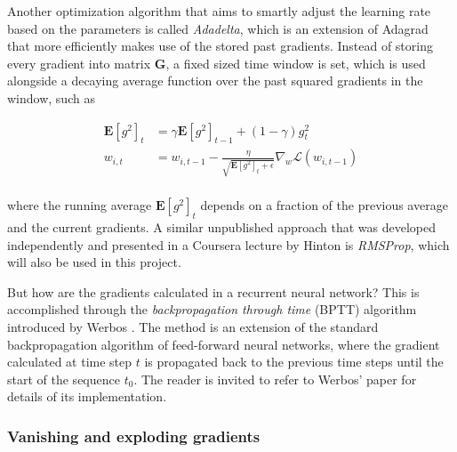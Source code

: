 \documentclass{kththesis}
\begin{document}
Another optimization algorithm that aims to smartly adjust the learning rate based on the parameters is called \emph{Adadelta}\citep{zeiler2012adadelta}, which is an extension of Adagrad that more efficiently makes use of the stored past gradients. Instead of storing every gradient into matrix $\mathbf{G}$, a fixed sized time window is set, which is used alongside a decaying average function over the past squared gradients in the window, such as

\begin{equation}
\begin{aligned}
\mathbf{E}[g^2]_t &= \gamma \mathbf{E}[g^2]_{t-1} + (1-\gamma)g^2_t\\
w_{i,t} &= w_{i,t-1} - \frac{\eta}{\sqrt{\mathbf{E}[g^2]_t + \epsilon}} \nabla_w \mathcal{L}(w_{i,t-1}) \\
\end{aligned}
\end{equation}

where the running average $\mathbf{E}[g^2]_t$ depends on a fraction of the previous average and the current gradients. A similar unpublished approach that was developed independently and presented in a Coursera lecture by Hinton is \emph{RMSProp}\citep{hinton2012rmsprop}, which will also be used in this project. 

But how are the gradients calculated in a recurrent neural network? This is accomplished through the \emph{backpropagation through time} (BPTT) algorithm introduced by Werbos \citep{werbos1990backpropagation}. The method is an extension of the standard backpropagation algorithm of feed-forward neural networks, where the gradient calculated at time step $t$ is propagated back to the previous time steps until the start of the sequence $t_0$. The reader is invited to refer to Werbos' paper for details of its implementation.

\subsubsection{Vanishing and exploding gradients}
\end{document}
